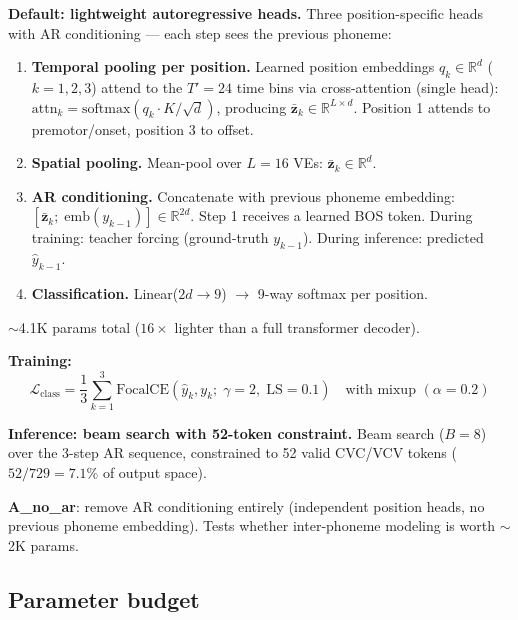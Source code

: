 \documentclass[11pt,letterpaper]{article}
\newcommand{\bfz}{\mathbf{z}}
\newcommand{\R}{\mathbb{R}}
\begin{document}
\textbf{Default: lightweight autoregressive heads.} Three position-specific heads with AR conditioning --- each step sees the previous phoneme:

\begin{enumerate}[leftmargin=2em]
\item \textbf{Temporal pooling per position.} Learned position embeddings $q_k \in \R^d$ ($k{=}1,2,3$) attend to the $T'{=}24$ time bins via cross-attention (single head): $\text{attn}_k = \text{softmax}(q_k \cdot K / \sqrt{d})$, producing $\bar{\bfz}_k \in \R^{L \times d}$. Position 1 attends to premotor/onset, position 3 to offset.
\item \textbf{Spatial pooling.} Mean-pool over $L{=}16$ VEs: $\bar{\bfz}_k \in \R^d$.
\item \textbf{AR conditioning.} Concatenate with previous phoneme embedding: $[\bar{\bfz}_k;\; \text{emb}(y_{k-1})] \in \R^{2d}$. Step 1 receives a learned BOS token. During training: teacher forcing (ground-truth $y_{k-1}$). During inference: predicted $\hat{y}_{k-1}$.
\item \textbf{Classification.} Linear($2d \to 9$) $\to$ 9-way softmax per position.
\end{enumerate}

${\sim}$4.1K params total ($16\times$ lighter than a full transformer decoder).

\textbf{Training:}
\begin{equation}
\mathcal{L}_\text{class} = \frac{1}{3}\sum_{k=1}^{3} \text{FocalCE}(\hat{y}_k, y_k;\; \gamma{=}2,\; \text{LS}{=}0.1) \quad \text{with mixup } (\alpha{=}0.2)
\end{equation}

\textbf{Inference: beam search with 52-token constraint.} Beam search ($B{=}8$) over the 3-step AR sequence, constrained to 52 valid CVC/VCV tokens ($52/729 = 7.1\%$ of output space).

\textbf{A\_no\_ar}: remove AR conditioning entirely (independent position heads, no previous phoneme embedding). Tests whether inter-phoneme modeling is worth ${\sim}$2K params.


\subsection{Parameter budget}
\end{document}
